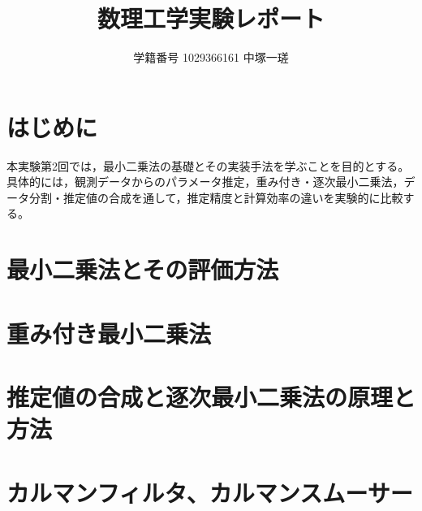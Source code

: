 \documentclass[a4paper,11pt]{ltjsarticle}
\title{数理工学実験レポート\\[4pt]\large \ChapterTitle}
\author{学籍番号 1029366161 \quad 中塚一瑳}
\date{\ExperimentDate}
\newcommand{\R}{\mathbb{R}}
\begin{document}
\maketitle
\begin{abstract}
\end{abstract}

\tableofcontents
\clearpage


\section{はじめに}
本実験第2回では，最小二乗法の基礎とその実装手法を学ぶことを目的とする。具体的には，観測データからのパラメータ推定，重み付き・逐次最小二乗法，データ分割・推定値の合成を通して，推定精度と計算効率の違いを実験的に比較する。


\section{最小二乗法とその評価方法}



\section{重み付き最小二乗法}



\section{推定値の合成と逐次最小二乗法の原理と方法}



\section {カルマンフィルタ、カルマンスムーサー}
\end{document}
